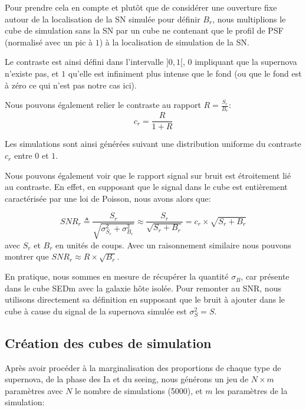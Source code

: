\documentclass[../main/main.tex]{subfiles}
\begin{document}
Pour prendre cela en compte et plutôt que de considérer une ouverture fixe
autour de la localisation de la SN simulée pour définir $B_{r}$, nous
multiplions le cube de simulation sans la SN par un cube ne contenant
que le profil de PSF (normalisé avec un pic à $1$) à la localisation de
simulation de la SN.

Le contraste est ainsi défini dans l'intervalle $]0,1[$, $0$ impliquant
que la supernova n'existe pas, et $1$ qu'elle est infiniment plus
intense que le fond (ou que le fond est à zéro ce qui n'est pas notre
cas ici).

Nous pouvons également relier le contraste au rapport $R=\frac{S_{r}}{B_{r}}$:
\begin{equation}
  \label{eq:rapportSB}
  c_{r} = \frac{R}{1+R}
\end{equation}

Les simulations sont ainsi générées suivant une distribution uniforme du
contraste $c_{r}$ entre $0$ et $1$.

Nous pouvons également voir que le rapport signal sur bruit est
étroitement lié au contraste. En effet, en supposant que le signal dans
le cube est
entièrement caractérisée par une loi de Poisson, nous avons alors que:

\begin{equation}
  \label{eq:SNR}
  SNR_{r} \triangleq \frac{S_{r}}{\sqrt{\sigma_{S_{r}}^{2}+\sigma_{B_{r}}^{2}}}\approx
  \frac{S_{r}}{\sqrt{S_{r}+B_{r}}} = c_{r}\times\sqrt{S_{r}+B_{r}}
\end{equation}
avec $S_{r}$ et $B_{r}$ en unités de coups. Avec un raisonnement similaire nous
pouvons montrer que $SNR_{r}\approx R\times\sqrt{B_{r}}$.

En pratique, nous sommes en mesure de récupérer la quantité
$\sigma_{B}$, car présente dans le cube SEDm avec la galaxie hôte
isolée. Pour remonter au SNR, nous utilisons directement sa définition
en supposant que le bruit à ajouter dans le cube à cause du signal de la
supernova simulée est $\sigma_{S}^{2}=S$.

\subsection{Création des cubes de simulation}

Après avoir procéder à la marginalisation des proportions de chaque type
de supernova, de la phase des Ia et du seeing, nous générons un jeu de
$N\times m$ paramètres avec $N$ le nombre de simulations (5000), et $m$
les paramètres de la simulation:\\
\end{document}
